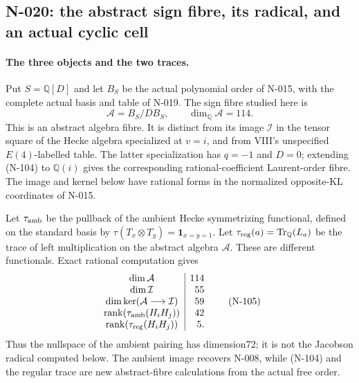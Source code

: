 \subsection{N-020: the abstract sign fibre, its radical, and an actual cyclic cell}
\label{sec:nonstandard-sign-fibre}

\paragraph{The three objects and the two traces.}
Put $S=\mathbb Q[D]$ and let $B_S$ be the actual polynomial order
of N-015, with the complete actual basis and table of N-019.
The sign fibre studied here is
\[
 \mathcal A=B_S/DB_S,\qquad \dim_{\mathbb Q}\mathcal A=114.
 \tag{N-104}
\]
This is an abstract algebra fibre.  It is distinct from its image
$\mathcal I$ in the tensor square of the Hecke algebra specialized
at $v=i$, and from VIII's unspecified $E(4)$-labelled table.
The latter specialization has $q=-1$ and $D=0$; extending (N-104)
to $\mathbb Q(i)$ gives the corresponding rational-coefficient
Laurent-order fibre.  The image and kernel below have rational
forms in the normalized opposite-KL coordinates of N-015.

Let $\tau_{\rm amb}$ be the pullback of the ambient Hecke
symmetrizing functional, defined on the standard basis by
$\tau(T_x\otimes T_y)=\mathbf1_{x=y=1}$.
Let $\tau_{\rm reg}(a)=\operatorname{Tr}_{\mathbb Q}(L_a)$ be
the trace of left multiplication on the abstract algebra
$\mathcal A$.  These are different functionals.  Exact rational
computation gives
\[
\begin{array}{c|r}
 \dim\mathcal A&114\\
 \dim\mathcal I&55\\
 \dim\ker(\mathcal A\longrightarrow\mathcal I)&59\\
 \operatorname{rank}(\tau_{\rm amb}(H_iH_j))&42\\
 \operatorname{rank}(\tau_{\rm reg}(H_iH_j))&5.
\end{array}
\tag{N-105}
\]
Thus the nullspace of the ambient pairing has dimension72;
it is not the Jacobson radical computed below.  The ambient image
recovers N-008, while (N-104) and the regular trace are new
abstract-fibre calculations from the actual free order.

